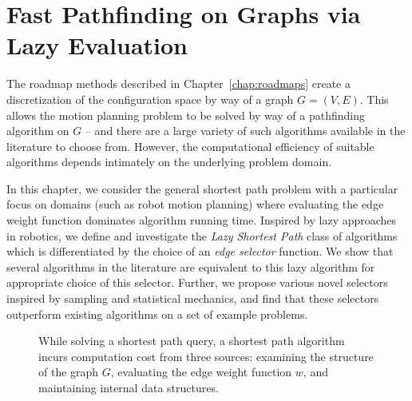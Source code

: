 \chapter{Fast Pathfinding on Graphs via Lazy Evaluation}
\label{chap:lazysp}

The roadmap methods described in Chapter~\ref{chap:roadmaps}
create a discretization of the configuration space by way of
a graph $G = (V,E)$.
This allows the motion planning problem to be solved by way of
a pathfinding algorithm on $G$
-- and there are a large variety of such algorithms available
in the literature to choose from.
However,
the computational efficiency of suitable algorithms
depends intimately on the underlying problem domain.

In this chapter,
we consider the general shortest path problem
with a particular focus on domains (such as robot motion planning)
where evaluating the edge weight function
dominates algorithm running time.
Inspired by lazy approaches in robotics,
we define and investigate the \emph{Lazy Shortest Path} class of
algorithms which is differentiated by the choice of
an \emph{edge selector} function.
We show that several algorithms in the literature are equivalent to
this lazy algorithm for appropriate choice of this selector.
Further, we propose various novel selectors inspired by
sampling and statistical mechanics,
and find that these selectors outperform
existing algorithms on a set of example problems.

\begin{figure}
\centering
{}
\caption{While solving a shortest path query,
   a shortest path algorithm incurs computation cost from three sources:
   examining the structure of the graph $G$,
   evaluating the edge weight function $w$,
   and maintaining internal data structures.}
\label{fig:sp-intro}
\end{figure}

